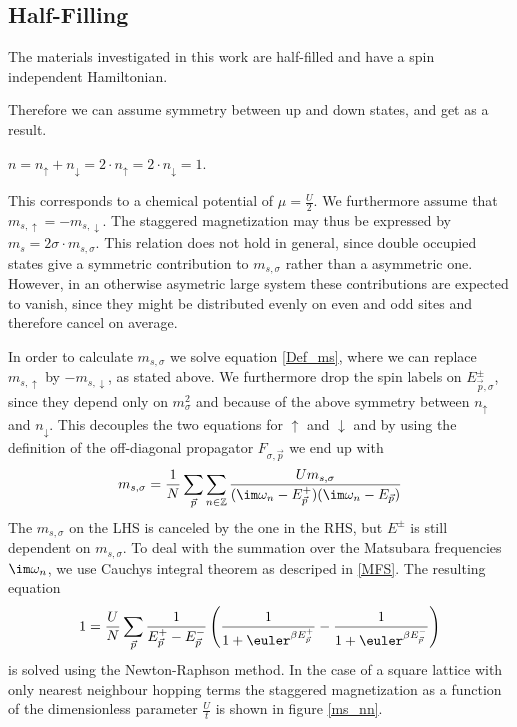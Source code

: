 \documentclass[a4paper,10pt]{report}
\begin{document}
\subsection{Half-Filling}

The materials investigated in this work are half-filled and have a spin independent Hamiltonian.

Therefore we can assume symmetry between up and down states, and get as a result.



$n=n_{\uparrow}+n_{\downarrow}=2\cdot n_{\uparrow}= 2\cdot n_{\downarrow} = 1$.

This corresponds to a chemical potential of 
$\mu=\frac{U}2$.
We furthermore assume that $m_{s,\uparrow}=-m_{s,\downarrow}$. 
The staggered magnetization may thus be expressed by $m_s=2\sigma \cdot m_{s,\sigma}$.
This relation does not hold in general, since double occupied states give a symmetric contribution to $m_{s,\sigma}$ rather than a asymmetric one.
However, in an otherwise asymetric large system these contributions are expected to vanish, since they might be distributed evenly on even and odd sites 
and therefore cancel on average.

In order to calculate $m_ {s,\sigma}$ we solve equation \ref{Def_ms}, where we can replace $m_{s,\uparrow}$ by $-m_{s,\downarrow}$, as stated above.
We furthermore drop the spin labels on $E_{\vec p,\sigma}^{\pm}$, since they depend only on $m_{\sigma}^2$ and because of the above symmetry between $n_{\uparrow}$ and $n_{\downarrow}$.
This decouples the two equations for $\uparrow$ and $\downarrow$ and by using the definition of the off-diagonal propagator $F_{\sigma,\vec{p}}$ we end up with
\begin{equation}
 m_{s,\sigma} = \frac1N \sum_{\vec{p}} \sum_{n\in \mathbb{Z}} 
							      \frac { Um_{s,\sigma} }
								    { (\im \omega_n - E_{\vec{p}}^+) (\im \omega_n - E_{\vec{p}})}
\end{equation}
The $m_{s,\sigma}$ on the LHS is canceled by the one in the RHS, but $E^{\pm}$ is still dependent on $m_{s,\sigma}$.
To deal with the summation over the Matsubara frequencies $\im \omega_n$, we use Cauchys integral theorem as descriped in \ref{MFS}.
The resulting equation
\begin{equation}
 1= \frac{U}{N}\sum_{\vec{p}} \frac{1}{E_{\vec p}^+ - E_{\vec{p}}^-} \left( \frac{1}{1+\euler^{\beta E_{\vec p}^+}} - \frac{1}{1+\euler^{\beta E_{\vec p}^-}} \right)
\end{equation}
is solved using the Newton-Raphson method.
In the case of a square lattice with only nearest neighbour hopping terms the staggered magnetization as a function of the dimensionless parameter $\frac{U}{t}$ is shown in figure
\ref{ms_nn}.
\end{document}
